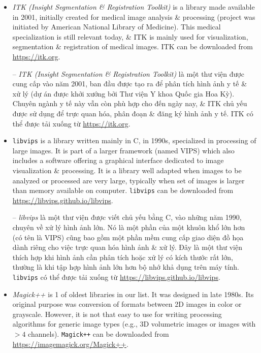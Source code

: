 \documentclass{article}
\begin{document}
\begin{itemize}
\begin{itemize}
\begin{itemize}
            \item {\it ITK (Insight Segmentation \& Registration Toolkit)} is a library made available in 2001, initially created for medical image analysis \& processing (project was initiated by American National Library of Medicine). This medical specialization is still relevant today, \& ITK is mainly used for visualization, segmentation \& registration of medical images. ITK can be downloaded from \url{https://itk.org}.
            
            -- {\it ITK (Insight Segmentation \& Registration Toolkit)} là một thư viện được cung cấp vào năm 2001, ban đầu được tạo ra để phân tích hình ảnh y tế \& xử lý (dự án được khởi xướng bởi Thư viện Y khoa Quốc gia Hoa Kỳ). Chuyên ngành y tế này vẫn còn phù hợp cho đến ngày nay, \& ITK chủ yếu được sử dụng để trực quan hóa, phân đoạn \& đăng ký hình ảnh y tế. ITK có thể được tải xuống từ \url{https://itk.org}.
            
            \item {\tt libvips} is a library written mainly in C, in 1990s, specialized in processing of large images. It is part of a larger framework (named VIPS) which also includes a software offering a graphical interface dedicated to image visualization \& processing. It is a library well adapted when images to be analyzed or processed are very large, typically when set of images is larger than memory available on computer. {\tt libvips} can be downloaded from \url{https://libvips.github.io/libvips}.
            
            -- {\it libvips} là một thư viện được viết chủ yếu bằng C, vào những năm 1990, chuyên về xử lý hình ảnh lớn. Nó là một phần của một khuôn khổ lớn hơn (có tên là VIPS) cũng bao gồm một phần mềm cung cấp giao diện đồ họa dành riêng cho việc trực quan hóa hình ảnh \& xử lý. Đây là một thư viện thích hợp khi hình ảnh cần phân tích hoặc xử lý có kích thước rất lớn, thường là khi tập hợp hình ảnh lớn hơn bộ nhớ khả dụng trên máy tính. {\tt libvips} có thể được tải xuống từ \url{https://libvips.github.io/libvips}.
            
            \item {\it Magick++} is 1 of oldest libraries in our list. It was designed in late 1980s. Its original purpose was conversion of formats between 2D images in color or grayscale. However, it is not that easy to use for writing processing algorithms for generic image types (e.g., 3D volumetric images or images with $> 4$ channels). {\tt Magick++} can be downloaded from \url{https://imagemagick.org/Magick++}.
            

\end{itemize}
\end{itemize}
\end{itemize}
\end{document}
